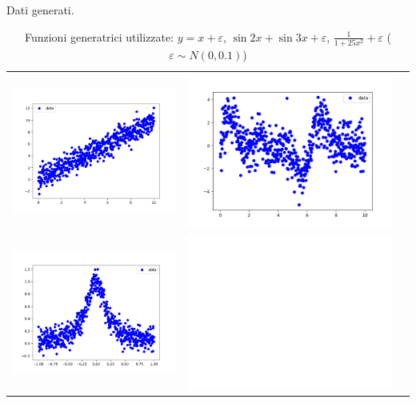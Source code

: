 \documentclass[../main.tex]{subfiles}
\begin{document}
\begin{table}
    \centering
    \caption{Dati generati.\label{tab:Dati}}
        \begin{tabular}{ccc}
             \includegraphics[width=0.45\linewidth]{Immagini/Introduzione/retta.png}
            & \includegraphics[width=0.45\linewidth]{Immagini/Introduzione/seno_complesso.png}\\[-4pt]
            \includegraphics[width=0.45\linewidth]{Immagini/Introduzione/runge.png}
            &\includegraphics[width=0.45\linewidth]{Immagini/blank.png}\\[-4pt]
        \end{tabular}%
        \caption{Funzioni generatrici utilizzate: $y = x + \varepsilon$,  $\sin{2x} + \sin{3x} + \varepsilon$,  $\frac{1}{1+25x^2} + \varepsilon$ ($\varepsilon\sim N(0,0.1) $)}
\end{table}
\end{document}
